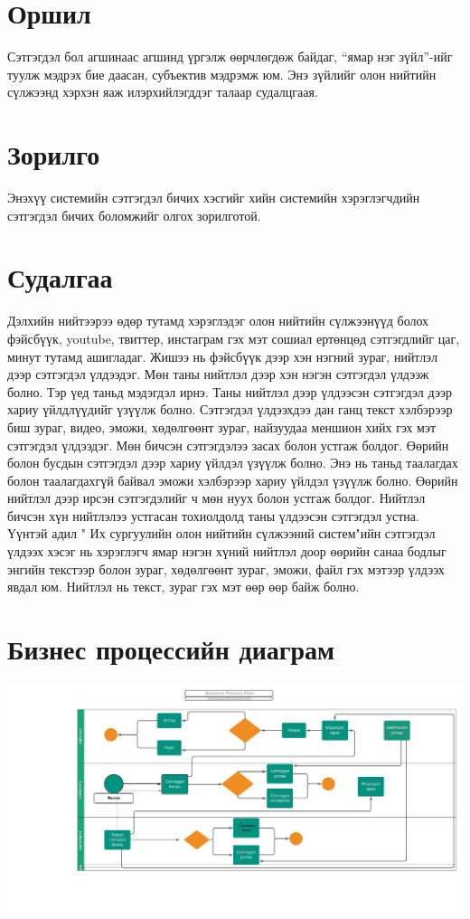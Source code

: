 \documentclass[12pt]{article}
\begin{document}
	\tableofcontents
	\newpage
	
	
	
	
	
	\section{Оршил}
	    
	Сэтгэгдэл бол агшинаас агшинд үргэлж өөрчлөгдөж байдаг, “ямар нэг зүйл”-ийг туулж мэдрэх бие даасан, субъектив мэдрэмж юм.  Энэ зүйлийг олон нийтийн сүлжээнд хэрхэн яаж илэрхийлэгддэг талаар судалцгаая.
	\section{Зорилго}
	Энэхүү системийн сэтгэгдэл бичих хэсгийг хийн системийн хэрэглэгчдийн сэтгэгдэл бичих боломжийг олгох зорилготой.
	  
   	\section{Судалгаа}
   Дэлхийн нийтээрээ өдөр тутамд хэрэглэдэг олон нийтийн сүлжээнүүд болох фэйсбүүк, youtube, твиттер, инстаграм гэх мэт сошиал ертөнцөд сэтгэгдлийг цаг, минут тутамд ашигладаг. Жишээ нь фэйсбүүк дээр хэн нэгний зураг, нийтлэл дээр сэтгэгдэл үлдээдэг. Мөн таны нийтлэл дээр хэн нэгэн сэтгэгдэл үлдээж болно. Тэр үед таньд мэдэгдэл ирнэ. Таны нийтлэл дээр үлдээсэн сэтгэгдэл дээр хариу үйлдлүүдийг үзүүлж болно. Сэтгэгдэл үлдээхдээ дан ганц текст хэлбэрээр биш зураг, видео, эможи, хөдөлгөөнт зураг, найзуудаа меншион хийх гэх мэт сэтгэгдэл үлдээдэг. Мөн бичсэн сэтгэгдэлээ засах болон устгаж болдог. Өөрийн болон бусдын сэтгэгдэл дээр хариу үйлдэл үзүүлж болно. Энэ нь таньд таалагдах болон таалагдахгүй байвал эможи хэлбэрээр хариу үйлдэл үзүүлж болно. Өөрийн нийтлэл дээр ирсэн сэтгэгдэлийг ч мөн нуух болон устгаж болдог. Нийтлэл бичсэн хүн нийтлэлээ устгасан тохиолдолд таны үлдээсэн сэтгэгдэл устна. Үүнтэй адил " Их сургуулийн олон нийтийн сүлжээний систем"ийн сэтгэгдэл үлдээх хэсэг нь хэрэглэгч ямар нэгэн хүний нийтлэл доор өөрийн санаа бодлыг энгийн текстээр болон зураг, хөдөлгөөнт зураг, эможи, файл гэх мэтээр үлдээх явдал юм. Нийтлэл нь текст, зураг гэх мэт өөр өөр байж болно. 
   \section{Бизнес процессийн диаграм}
   \includegraphics[scale=0.5]{BPDiagram} 
\end{document}
